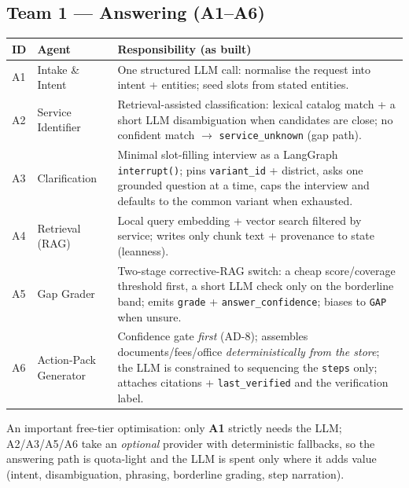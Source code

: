 \documentclass[11pt,a4paper]{article}
\begin{document}
\subsection{Team 1 --- Answering (A1--A6)}
\begin{center}
\begin{tabularx}{\linewidth}{@{}l l Y@{}}
\toprule
\textbf{ID} & \textbf{Agent} & \textbf{Responsibility (as built)} \\
\midrule
A1 & Intake \& Intent & One structured LLM call: normalise the request into intent + entities; seed
slots from stated entities. \\
A2 & Service Identifier & Retrieval-assisted classification: lexical catalog match + a short LLM
disambiguation when candidates are close; no confident match $\to$ \texttt{service\_unknown} (gap
path). \\
A3 & Clarification & Minimal slot-filling interview as a LangGraph \texttt{interrupt()}; pins
\texttt{variant\_id} + district, asks one grounded question at a time, caps the interview and defaults
to the common variant when exhausted. \\
A4 & Retrieval (RAG) & Local query embedding + vector search filtered by service; writes only chunk
text + provenance to state (leanness). \\
A5 & Gap Grader & Two-stage corrective-RAG switch: a cheap score/coverage threshold first, a short LLM
check only on the borderline band; emits \texttt{grade} + \texttt{answer\_confidence}; biases to
\texttt{GAP} when unsure. \\
A6 & Action-Pack Generator & Confidence gate \emph{first} (AD-8); assembles documents/fees/office
\emph{deterministically from the store}; the LLM is constrained to sequencing the \texttt{steps} only;
attaches citations + \texttt{last\_verified} and the verification label. \\
\bottomrule
\end{tabularx}
\end{center}

\noindent An important free-tier optimisation: only \textbf{A1} strictly needs the LLM; A2/A3/A5/A6
take an \emph{optional} provider with deterministic fallbacks, so the answering path is quota-light and
the LLM is spent only where it adds value (intent, disambiguation, phrasing, borderline grading, step
narration).
\end{document}
